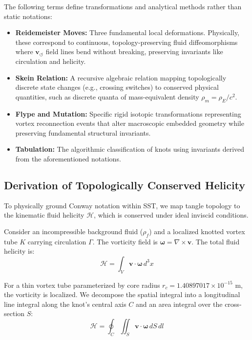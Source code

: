 \documentclass[10pt]{article}
\begin{document}
        The following terms define transformations and analytical methods rather than static notations:
        \begin{itemize}
            \item \textbf{Reidemeister Moves:} Three fundamental local deformations. Physically, these correspond to continuous, topology-preserving fluid diffeomorphisms where $\mathbf{v}_{\!\boldsymbol{\circlearrowleft}}$ field lines bend without breaking, preserving invariants like circulation and helicity.
            \item \textbf{Skein Relation:} A recursive algebraic relation mapping topologically discrete state changes (e.g., crossing switches) to conserved physical quantities, such as discrete quanta of mass-equivalent density $\rho_{\!m} = \rho_{\!E}/c^2$.
            \item \textbf{Flype and Mutation:} Specific rigid isotopic transformations representing vortex reconnection events that alter macroscopic embedded geometry while preserving fundamental structural invariants.
            \item \textbf{Tabulation:} The algorithmic classification of knots using invariants derived from the aforementioned notations.
        \end{itemize}

    \subsection{Derivation of Topologically Conserved Helicity}

        To physically ground Conway notation within SST, we map tangle topology to the kinematic fluid helicity $\mathcal{H}$, which is conserved under ideal inviscid conditions.

        Consider an incompressible background fluid ($\rho_{\!f}$) and a localized knotted vortex tube $K$ carrying circulation $\Gamma$. The vorticity field is $\boldsymbol{\omega} = \nabla \times \mathbf{v}$. The total fluid helicity is:
        \begin{equation}
            \mathcal{H} = \int_{V} \mathbf{v} \cdot \boldsymbol{\omega} \, d^3x
        \end{equation}

        For a thin vortex tube parameterized by core radius $r_c = 1.40897017 \times 10^{-15} \text{ m}$, the vorticity is localized. We decompose the spatial integral into a longitudinal line integral along the knot's central axis $C$ and an area integral over the cross-section $S$:
        \begin{equation}
            \mathcal{H} = \oint_{C} \iint_{S} \mathbf{v} \cdot \boldsymbol{\omega} \, dS \, dl
        \end{equation}
\end{document}
